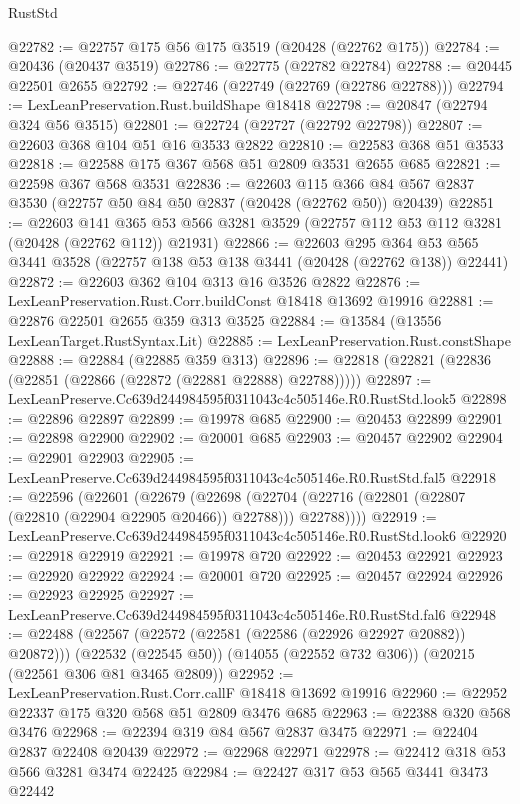 \begin{lexlean}{RustStd}
\begin{coremodule}
@22782 := @22757 @175 @56 @175 @3519 (@20428 (@22762 @175))
@22784 := @20436 (@20437 @3519)
@22786 := @22775 (@22782 @22784)
@22788 := @20445 @22501 @2655
@22792 := @22746 (@22749 (@22769 (@22786 @22788)))
@22794 := LexLeanPreservation.Rust.buildShape @18418
@22798 := @20847 (@22794 @324 @56 @3515)
@22801 := @22724 (@22727 (@22792 @22798))
@22807 := @22603 @368 @104 @51 @16 @3533 @2822
@22810 := @22583 @368 @51 @3533
@22818 := @22588 @175 @367 @568 @51 @2809 @3531 @2655 @685
@22821 := @22598 @367 @568 @3531
@22836 := @22603
    @115
    @366
    @84
    @567
    @2837
    @3530
    (@22757 @50 @84 @50 @2837 (@20428 (@22762 @50)) @20439)
@22851 := @22603
    @141
    @365
    @53
    @566
    @3281
    @3529
    (@22757 @112 @53 @112 @3281 (@20428 (@22762 @112)) @21931)
@22866 := @22603
    @295
    @364
    @53
    @565
    @3441
    @3528
    (@22757 @138 @53 @138 @3441 (@20428 (@22762 @138)) @22441)
@22872 := @22603 @362 @104 @313 @16 @3526 @2822
@22876 := LexLeanPreservation.Rust.Corr.buildConst @18418 @13692 @19916
@22881 := @22876 @22501 @2655 @359 @313 @3525
@22884 := @13584 (@13556 LexLeanTarget.RustSyntax.Lit)
@22885 := LexLeanPreservation.Rust.constShape
@22888 := @22884 (@22885 @359 @313)
@22896 := @22818 (@22821 (@22836 (@22851 (@22866 (@22872 (@22881 @22888) @22788)))))
@22897 := LexLeanPreserve.Cc639d244984595f0311043c4c505146e.R0.RustStd.look5
@22898 := @22896 @22897
@22899 := @19978 @685
@22900 := @20453 @22899
@22901 := @22898 @22900
@22902 := @20001 @685
@22903 := @20457 @22902
@22904 := @22901 @22903
@22905 := LexLeanPreserve.Cc639d244984595f0311043c4c505146e.R0.RustStd.fal5
@22918 := @22596
    (@22601
      (@22679
        (@22698 (@22704 (@22716 (@22801 (@22807 (@22810 (@22904 @22905 @20466)) @22788))) @22788))))
@22919 := LexLeanPreserve.Cc639d244984595f0311043c4c505146e.R0.RustStd.look6
@22920 := @22918 @22919
@22921 := @19978 @720
@22922 := @20453 @22921
@22923 := @22920 @22922
@22924 := @20001 @720
@22925 := @20457 @22924
@22926 := @22923 @22925
@22927 := LexLeanPreserve.Cc639d244984595f0311043c4c505146e.R0.RustStd.fal6
@22948 := @22488
    (@22567 (@22572 (@22581 (@22586 (@22926 @22927 @20882)) @20872)))
    (@22532 (@22545 @50))
    (@14055 (@22552 @732 @306))
    (@20215 (@22561 @306 @81 @3465 @2809))
@22952 := LexLeanPreservation.Rust.Corr.callF @18418 @13692 @19916
@22960 := @22952 @22337 @175 @320 @568 @51 @2809 @3476 @685
@22963 := @22388 @320 @568 @3476
@22968 := @22394 @319 @84 @567 @2837 @3475
@22971 := @22404 @2837 @22408 @20439
@22972 := @22968 @22971
@22978 := @22412 @318 @53 @566 @3281 @3474 @22425
@22984 := @22427 @317 @53 @565 @3441 @3473 @22442

\end{coremodule}
\end{lexlean}
